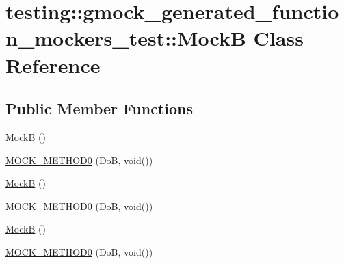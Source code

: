 \hypertarget{classtesting_1_1gmock__generated__function__mockers__test_1_1_mock_b}{}\section{testing\+::gmock\+\_\+generated\+\_\+function\+\_\+mockers\+\_\+test\+::MockB Class Reference}
\label{classtesting_1_1gmock__generated__function__mockers__test_1_1_mock_b}
\subsection*{Public Member Functions}
\begin{DoxyCompactItemize}
\item 
\mbox{\hyperlink{classtesting_1_1gmock__generated__function__mockers__test_1_1_mock_b_a74072ea75eb47e4e91e40151396014a1}{MockB}} ()
\item 
\mbox{\hyperlink{classtesting_1_1gmock__generated__function__mockers__test_1_1_mock_b_af0a5dcd462fc478e5e7a1ef503aafb05}{M\+O\+C\+K\+\_\+\+M\+E\+T\+H\+O\+D0}} (DoB, void())
\item 
\mbox{\hyperlink{classtesting_1_1gmock__generated__function__mockers__test_1_1_mock_b_a74072ea75eb47e4e91e40151396014a1}{MockB}} ()
\item 
\mbox{\hyperlink{classtesting_1_1gmock__generated__function__mockers__test_1_1_mock_b_af0a5dcd462fc478e5e7a1ef503aafb05}{M\+O\+C\+K\+\_\+\+M\+E\+T\+H\+O\+D0}} (DoB, void())
\item 
\mbox{\hyperlink{classtesting_1_1gmock__generated__function__mockers__test_1_1_mock_b_a74072ea75eb47e4e91e40151396014a1}{MockB}} ()
\item 
\mbox{\hyperlink{classtesting_1_1gmock__generated__function__mockers__test_1_1_mock_b_af0a5dcd462fc478e5e7a1ef503aafb05}{M\+O\+C\+K\+\_\+\+M\+E\+T\+H\+O\+D0}} (DoB, void())
\end{DoxyCompactItemize}
